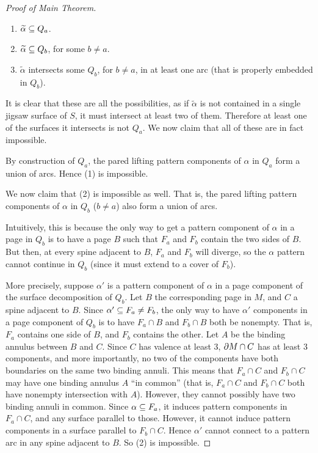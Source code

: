 \begin{proof}[Proof of Main Theorem]
\begin{enumerate}
\item $\widetilde{\alpha} \subseteq Q_a$.

\item $\widetilde{\alpha} \subseteq Q_b$, for some $b \neq a$.

\item $\widetilde{\alpha}$ intersects some $Q_b$, for $b \neq a$, in at least
one arc (that is properly embedded in $Q_b$).

\end{enumerate}

It is clear that these are all the possibilities, as if $\widetilde{\alpha}$ is
not contained in a single jigsaw surface of $S$, it must intersect at least two
of them. Therefore at least one of the surfaces it intersects is not $Q_a$. We
now claim that all of these are in fact impossible.

By construction of $Q_a$, the pared lifting pattern components of $\alpha$ in
$Q_a$ form a union of arcs. Hence (1) is impossible.

We now claim that (2) is impossible as well. That is, the pared lifting pattern
components of $\alpha$ in $Q_b$ ($b \neq a$) also form a union of arcs.

Intuitively, this is because the only way to get a pattern component of
$\alpha$ in a page in $Q_b$ is to have a page $B$ such that $F_a$ and $F_b$
contain the two sides of $B$.  But then, at every spine adjacent to $B$, $F_a$
and $F_b$ will diverge, so the $\alpha$ pattern cannot continue in $Q_b$ (since
it must extend to a cover of $F_b$).

More precisely, suppose $\alpha'$ is a pattern component of $\alpha$ in a page
component of the surface decomposition of $Q_b$. Let $B$ the corresponding page
in $M$, and $C$ a spine adjacent to $B$. Since $\alpha' \subseteq F_a \neq F_b$, the
only way to have $\alpha'$ components in a page component of $Q_b$ is to have
$F_a \cap B$ and $F_b \cap B$ both be nonempty. That is, $F_a$ contains one
side of $B$, and $F_b$ contains the other. Let $A$ be the binding annulus
between $B$ and $C$.  Since $C$ has valence at least 3, $\partial M \cap C$ has at
least 3 components, and more importantly, no two of the components have both
boundaries on the same two binding annuli. This means that $F_a \cap C$ and
$F_b \cap C$ may have one binding annulus $A$ ``in common'' (that is, $F_a \cap
C$ and $F_b \cap C$ both have nonempty intersection with $A$).  However, they
cannot possibly have two binding annuli in common.  Since $\alpha \subseteq F_a$, it
induces pattern components in $F_a \cap C$, and any surface parallel to those.
However, it cannot induce pattern components in a surface parallel to $F_b \cap
C$.  Hence $\alpha'$ cannot connect to a pattern arc in any spine adjacent to
$B$.  So (2) is impossible.


\end{proof}
